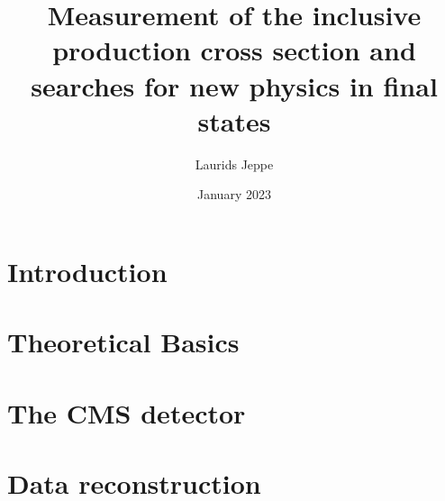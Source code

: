 \documentclass[12pt]{report}
\title{Measurement of the inclusive \ttbar production cross section and searches for new physics in \ttbar final states}
\author{Laurids Jeppe}
\date{January 2023}
\begin{document}
\maketitle

\newpage
\tableofcontents
\newpage

\chapter{Introduction}

\chapter{Theoretical Basics}
\label{ch:theory}

\chapter{The CMS detector}
\label{ch:detector}

\chapter{Data reconstruction}
\label{ch:reco}



\begin{appendix}
\thispagestyle{empty}


\end{appendix}
\end{document}
